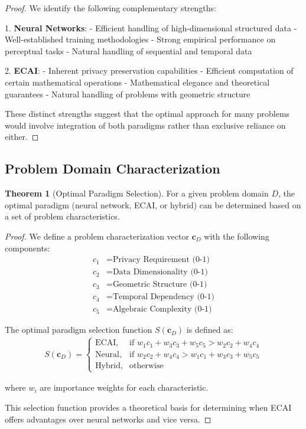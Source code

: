 \documentclass[12pt,a4paper]{article}
\theoremstyle{definition}
\newtheorem{theorem}{Theorem}
\begin{document}
\begin{proof}
We identify the following complementary strengths:

1. \textbf{Neural Networks}:
   - Efficient handling of high-dimensional structured data
   - Well-established training methodologies
   - Strong empirical performance on perceptual tasks
   - Natural handling of sequential and temporal data

2. \textbf{ECAI}:
   - Inherent privacy preservation capabilities
   - Efficient computation of certain mathematical operations
   - Mathematical elegance and theoretical guarantees
   - Natural handling of problems with geometric structure

These distinct strengths suggest that the optimal approach for many problems would involve integration of both paradigms rather than exclusive reliance on either.
\end{proof}

\subsection{Problem Domain Characterization}

\begin{theorem}[Optimal Paradigm Selection]
For a given problem domain $D$, the optimal paradigm (neural network, ECAI, or hybrid) can be determined based on a set of problem characteristics.
\end{theorem}

\begin{proof}
We define a problem characterization vector $\mathbf{c}_D$ with the following components:
\begin{align}
c_1 &= \text{Privacy Requirement (0-1)} \\
c_2 &= \text{Data Dimensionality (0-1)} \\
c_3 &= \text{Geometric Structure (0-1)} \\
c_4 &= \text{Temporal Dependency (0-1)} \\
c_5 &= \text{Algebraic Complexity (0-1)}
\end{align}

The optimal paradigm selection function $S(\mathbf{c}_D)$ is defined as:
\begin{align}
S(\mathbf{c}_D) = 
\begin{cases}
\text{ECAI}, & \text{if } w_1c_1 + w_3c_3 + w_5c_5 > w_2c_2 + w_4c_4 \\
\text{Neural}, & \text{if } w_2c_2 + w_4c_4 > w_1c_1 + w_3c_3 + w_5c_5 \\
\text{Hybrid}, & \text{otherwise}
\end{cases}
\end{align}

where $w_i$ are importance weights for each characteristic.

This selection function provides a theoretical basis for determining when ECAI offers advantages over neural networks and vice versa.
\end{proof}
\end{document}
